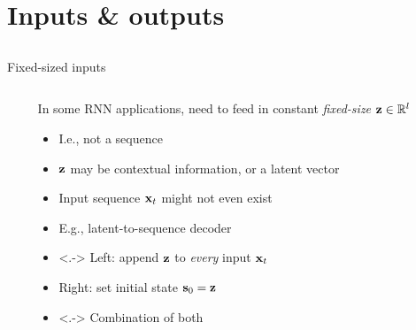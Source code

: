 \section{Inputs \& outputs}
\subsection{}

\begin{frame}{Fixed-sized inputs}
    \begin{columns}
        \begin{column}{0.15\textwidth}
        \end{column}
        \begin{column}{0.41\textwidth}
            In some RNN applications, need to feed in constant \emph{fixed-size} $\mathbf{z} \in \mathbb{R}^l$
            \begin{itemize}
                \item<+-> I.e., not a sequence
                \item $\mathbf{z}$ may be contextual information, or a latent vector
                \item Input sequence $\mathbf{x}_t$ might not even exist
                \item E.g., latent-to-sequence decoder
            \end{itemize}
            \begin{itemize}
                \item<.-> Left: append $\mathbf{z}$ to \emph{every} input $\mathbf{x}_t$
                \item<+-> Right: set initial state $\mathbf{s}_0 = \mathbf{z}$
                \item<.-> Combination of both
            \end{itemize}
        \end{column}
        \begin{column}{0.44\textwidth}
            \vspace{-4mm}
        \end{column}
    \end{columns}
\end{frame}

